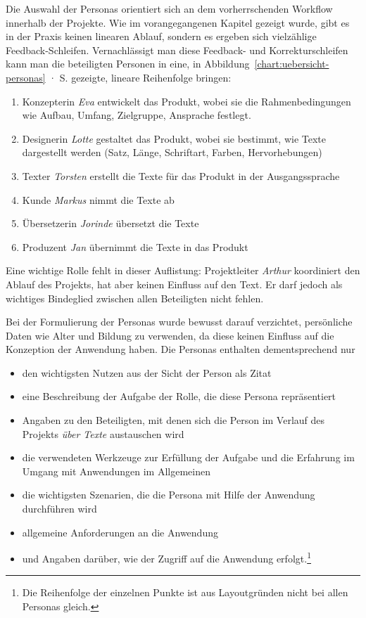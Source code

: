 Die Auswahl der Personas orientiert sich an dem vorherrschenden Workflow innerhalb der Projekte. Wie im vorangegangenen Kapitel gezeigt wurde, gibt es in der Praxis keinen linearen Ablauf, sondern es ergeben sich vielzählige Feedback-Schleifen. Vernachlässigt man diese Feedback- und Korrekturschleifen kann man die beteiligten Personen in eine, in Abbildung~\ref{chart:uebersicht-personas} · S.\pageref{chart:uebersicht-personas} gezeigte, lineare Reihenfolge bringen:
\begin{samepage}\begin{enumerate}\itemsep -5pt
\item Konzepterin \emph{Eva} entwickelt das Produkt, wobei sie die Rahmenbedingungen wie Aufbau, Umfang, Zielgruppe, Ansprache festlegt. 
\item Designerin \emph{Lotte} gestaltet das Produkt, wobei sie bestimmt, wie Texte dargestellt werden (Satz, Länge, Schriftart, Farben, Hervorhebungen)
\item Texter \emph{Torsten} erstellt die Texte für das Produkt in der Ausgangssprache
\item Kunde \emph{Markus} nimmt die Texte ab
\item Übersetzerin \emph{Jorinde} übersetzt die Texte
\item Produzent \emph{Jan} übernimmt die Texte in das Produkt
\end{enumerate}\end{samepage}

Eine wichtige Rolle fehlt in dieser Auflistung: Projektleiter \emph{Arthur} koordiniert den Ablauf des Projekts, hat aber keinen Einfluss auf den Text. Er darf jedoch als wichtiges Bindeglied zwischen allen Beteiligten nicht fehlen.

Bei der Formulierung der Personas wurde bewusst darauf verzichtet, persönliche Daten wie Alter und Bildung zu verwenden, da diese keinen Einfluss auf die Konzeption der Anwendung haben. Die Personas enthalten dementsprechend nur 
\begin{itemize}\itemsep -5pt
\item den wichtigsten Nutzen aus der Sicht der Person als Zitat
\item eine Beschreibung der Aufgabe der Rolle, die diese Persona repräsentiert
\item Angaben zu den Beteiligten, mit denen sich die Person im Verlauf des Projekts \emph{über Texte} austauschen wird
\item die verwendeten Werkzeuge zur Erfüllung der Aufgabe und die Erfahrung im Umgang mit Anwendungen im Allgemeinen
\item die wichtigsten Szenarien, die die Persona mit Hilfe der Anwendung durchführen wird
\item allgemeine Anforderungen an die Anwendung
\item und Angaben darüber, wie der Zugriff auf die Anwendung erfolgt.\footnote{Die Reihenfolge der einzelnen Punkte ist aus Layoutgründen nicht bei allen Personas gleich.}
\end{itemize}

